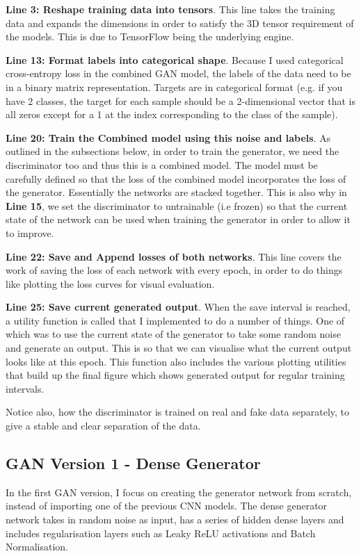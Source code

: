 \documentclass[12pt,a4paper,twoside]{report}
\begin{document}
\textbf{Line 3: Reshape training data into tensors}. This line takes the training data and expands the dimensions in order to satisfy the 3D tensor requirement of the models. This is due to TensorFlow being the underlying engine. 

\textbf{Line 13: Format labels into categorical shape}. Because I used categorical cross-entropy loss in the combined GAN model, the labels of the data need to be in a binary matrix representation. Targets are in categorical format (e.g. if you have 2 classes, the target for each sample should be a 2-dimensional vector that is all zeros except for a 1 at the index corresponding to the class of the sample).

\textbf{Line 20: Train the Combined model using this noise and labels}. As outlined in the subsections below, in order to train the generator, we need the discriminator too and thus this is a combined model. The model must be carefully defined so that the loss of the combined model incorporates the loss of the generator. Essentially the networks are stacked together. This is also why in \textbf{Line 15}, we set the discriminator to untrainable (i.e frozen) so that the current state of the network can be used when training the generator in order to allow it to improve. 

\textbf{Line 22: Save and Append losses of both networks}. This line covers the work of saving the loss of each network with every epoch, in order to do things like plotting the loss curves for visual evaluation.

\textbf{Line 25: Save current generated output}. When the save interval is reached, a utility function is called that I implemented to do a number of things. One of which was to use the current state of the generator to take some random noise and generate an output. This is so that we can visualise what the current output looks like at this epoch. This function also includes the various plotting utilities that build up the final figure which shows generated output for regular training intervals. 

Notice also, how the discriminator is trained on real and fake data separately, to give a stable and clear separation of the data.

\subsection{GAN Version 1 - Dense Generator}

In the first GAN version, I focus on creating the generator network from scratch, instead of importing one of the previous CNN models. The dense generator network takes in random noise as input, has a series of hidden dense layers and includes regularisation layers such as Leaky ReLU activations and Batch Normalisation.
\end{document}
